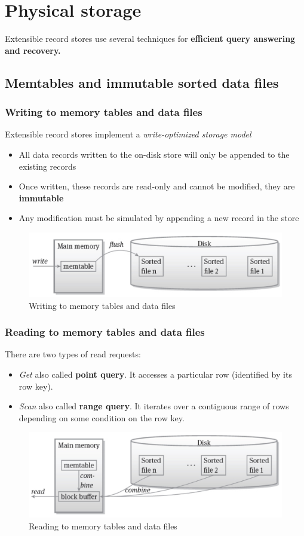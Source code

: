 \section{Physical storage}
Extensible record stores use several techniques for \textbf{efficient query answering and recovery.}

\subsection{Memtables and immutable sorted data files}
\subsubsection{Writing to memory tables and data files}
Extensible record stores implement a \textit{write-optimized storage model}
\begin{itemize}
    \item All data records written to the on-disk store will only be appended to the existing records
    \item Once written, these records are read-only and cannot be modified, they are \textbf{immutable}
    \item Any modification must be simulated by appending a new record in the store
\end{itemize}


\begin{figure}[!h]
    \centering
    \includegraphics[width=0.70\linewidth]{images/AdvancedDataManagment/extensible_record_store/writing.jpeg}
    \caption{Writing to memory tables and data files}
\end{figure}

\subsubsection{Reading to memory tables and data files}
There are two types of read requests:
\begin{itemize}
    \item \textit{Get} also called \textbf{point query}. It accesses a particular row (identified by its row key).
    \item \textit{Scan} also called \textbf{range query}. It iterates over a contiguous range of rows depending on some condition on the row key.
\end{itemize}
\begin{figure}[!h]
    \centering
    \includegraphics[width=0.70\linewidth]{images/AdvancedDataManagment/extensible_record_store/reading.jpeg}
    \caption{Reading to memory tables and data files}
\end{figure}



